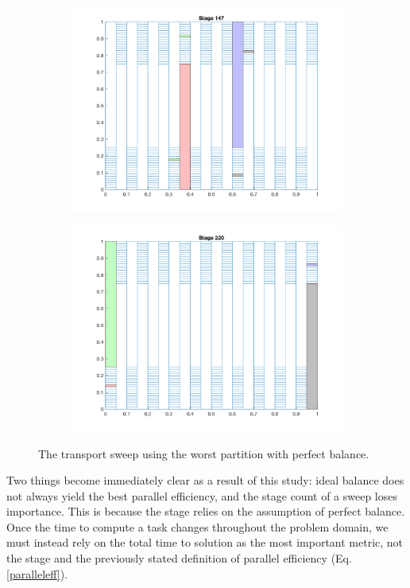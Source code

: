 \documentclass[11pt, letterpaper,titlepage,oneside]{article}
\begin{document}
\begin{figure}[H]
\begin{subfigure}{0.49\textwidth}
  \includegraphics[scale=0.5]{../figures/worst_partition_3.png}
  \end{subfigure}
  \begin{subfigure}{0.49\textwidth}
  \includegraphics[scale=0.5]{../figures/worst_partition_4.png}
  \end{subfigure}
  \caption{The transport sweep using the worst partition with perfect balance.}
  \label{worst_partition}
\end{figure}

Two things become immediately clear as a result of this study: ideal balance does not always yield the best parallel efficiency, and the stage count of a sweep loses importance. This is because the stage relies on the assumption of perfect balance. Once the time to compute a task changes throughout the problem domain, we must instead rely on the total time to solution as the most important metric, not the stage and the previously stated definition of parallel efficiency (Eq. \ref{paralleleff}). 
\end{document}

